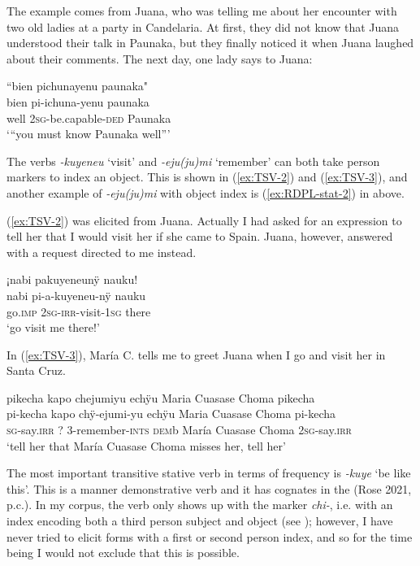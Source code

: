 The example comes from Juana, who was telling me about her encounter with two old ladies at a party in Candelaria. At first, they did not know that Juana understood their talk in Paunaka, but they finally noticed it when Juana laughed about their comments. The next day, one lady says to Juana:

\ea\label{ex:TSV-1}
\begingl
\glpreamble “bien pichunayenu paunaka"\\
\gla bien pi-ichuna-yenu paunaka\\
\glb well 2\textsc{sg}-be.capable-\textsc{ded} Paunaka\\
\glft ‘“you must know Paunaka well”’
\endgl
\trailingcitation{[jxx-p120515l-1.187]}
\xe
{}

The verbs \textit{-kuyeneu} ‘visit’ and \textit{-eju(ju)mi} ‘remember’ can both take person markers to index an object. This is shown in (\ref{ex:TSV-2}) and (\ref{ex:TSV-3}), and another example of \textit{-eju(ju)mi} with object index is (\ref{ex:RDPL-stat-2}) in  above.

(\ref{ex:TSV-2}) was elicited from Juana. Actually I had asked for an expression to tell her that I would visit her if she came to Spain. Juana, however, answered with a request directed to me instead.

\ea\label{ex:TSV-2}
\begingl
\glpreamble ¡nabi pakuyeneunÿ nauku!\\
\gla nabi pi-a-kuyeneu-nÿ nauku\\
\glb go.\textsc{imp} 2\textsc{sg}-\textsc{irr}-visit-1\textsc{sg} there\\
\glft ‘go visit me there!’
\endgl
\trailingcitation{[jxx-p110923l-1.268]}
\xe

In (\ref{ex:TSV-3}), María C. tells me to greet Juana when I go and visit her in Santa Cruz.

\ea\label{ex:TSV-3}
\begingl
\glpreamble pikecha kapo chejumiyu echÿu Maria Cuasase Choma pikecha\\
\gla pi-kecha kapo chÿ-ejumi-yu echÿu {Maria Cuasase Choma} pi-kecha\\
\textsc{sg}-say.\textsc{irr} ? 3-remember-\textsc{ints} \textsc{dem}b {María Cuasase Choma} 2\textsc{sg}-say.\textsc{irr}\\
\glft ‘tell her that María Cuasase Choma misses her, tell her’
\endgl
\trailingcitation{[uxx-e120427l.072]}
\xe

The most important transitive stative verb in terms of frequency is \textit{-kuye} ‘be like this’. This is a manner demonstrative verb \citep[cf.][]{Guerin2015} and it has cognates in the  (Rose 2021, p.c.). In my corpus, the verb only shows up with the marker \textit{chi-}, i.e. with an index encoding both a third person subject and object (see ); however, I have never tried to elicit forms with a first or second person index, and so for the time being I would not exclude that this is possible.

